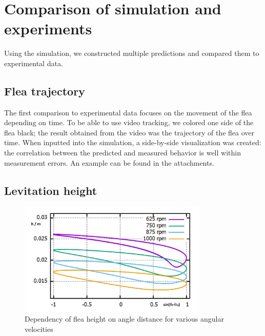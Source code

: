 \documentclass[10pt,a4paper]{article}
\begin{document}
\section{Comparison of simulation and experiments}
Using the simulation, we constructed multiple predictions and compared them to experimental data.

\subsection{Flea trajectory}
The first comparison to experimental data focuses on the movement of the flea depending on time. To be able to use video tracking, we colored one side of the flea black; the result obtained from the video was the trajectory of the flea over time. When inputted into the simulation, a side-by-side visualization was created: the correlation between the predicted and measured behavior is well within measurement errors. An example can be found in the attachments.
\subsection{Levitation height}

\begin{figure}[H]
  \centering
  \includegraphics[width=0.8\textwidth]{atraktory.png}
  \caption{Dependency of flea height on angle distance for various angular velocities}
  \label{obr:atraktory}
\end{figure}
\end{document}
